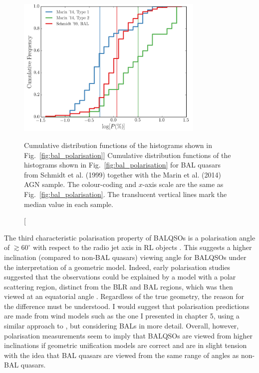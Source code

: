 \begin{figure}
\centering
\includegraphics[width=0.8\textwidth]{figures/ewpaper/cdf_p.png}
\caption
[Cumulative distribution functions of the histograms shown in
Fig.~\ref{fig:bal_polarisation}]
{
Cumulative distribution functions of the histograms shown in
Fig.~\ref{fig:bal_polarisation} for BAL quasars from Schmidt et al. (1999) 
together with the Marin et al. (2014) AGN sample. The colour-coding and 
$x$-axis scale are the same as Fig.~\ref{fig:bal_polarisation}. 
The translucent vertical lines mark the median value in each sample.
}
\label{fig:cdf_pol}
\end{figure}

The third characteristic polarisation property of BALQSOs 
is a polarisation angle of $\gtrsim60^\circ$ with respect
to the radio jet axis in RL objects \citep[][and references therein]{brotherton2006}.
This suggests a higher inclination (compared to non-BAL quasars)
viewing angle for BALQSOs under the interpretation of a geometric model. Indeed,
early polarisation studies suggested that the observations could be explained by a model
with a polar scattering region, distinct from the BLR and BAL regions, which was 
then viewed at an equatorial angle 
\citep[e.g.][]{goodrich1995, cohen1995,lamy2004}. Regardless of
the true geometry, the reason for the difference must be understood.
I would suggest that polarisation predictions are made from wind
models such as the one I presented in chapter 5, using a similar
approach to \cite{marin2013}, but considering BALs in more detail. 
Overall, however, polarisation measurements seem to imply that BALQSOs are viewed
from higher inclinations if geometric unification models are correct and are 
in slight tension with the idea that BAL quasars are viewed from the same range
of angles as non-BAL quasars.

